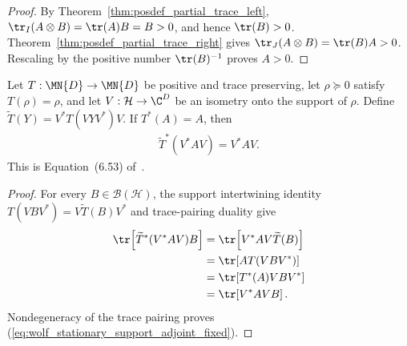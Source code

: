\begin{proof}
    \leanok
    By Theorem~\ref{thm:posdef_partial_trace_left},
    $\tr_I(A\otimes B)=\tr(A)B=B>0$, and hence $\tr(B)>0$.
    Theorem~\ref{thm:posdef_partial_trace_right} gives
    $\tr_J(A\otimes B)=\tr(B)A>0$. Rescaling by the positive number
    $\tr(B)^{-1}$ proves $A>0$.
\end{proof}

\begin{lemma}%
    \label{lem:trace_adjoint_stationary_support_compression_fixed}
    \leanok
    Let $T:\MN{D}\to\MN{D}$ be positive and trace preserving, let
    $\rho\succeq0$ satisfy $T(\rho)=\rho$, and let
    $V:\mathcal H\to\C^D$ be an isometry onto the support of $\rho$. Define
    $\widetilde T(Y)=V^*T(VYV^*)V$. If $T^*(A)=A$, then
    \begin{align}
        \widetilde T^*(V^*AV)=V^*AV.
        \label{eq:wolf_stationary_support_adjoint_fixed}
    \end{align}
    This is Equation~(6.53) of~\cite{Wolf2012Quantum}.
\end{lemma}

\begin{proof}
    \leanok
    For every $B\in\mathcal B(\mathcal H)$, the support intertwining
    identity $T(VBV^*)=V\widetilde T(B)V^*$ and trace-pairing duality give
    \begin{align}
        \tr\!\left[\widetilde T^*(V^*AV)B\right]
        &=\tr\!\left[V^*AV\widetilde T(B)\right]\\
        &=\tr\!\left[AT(VBV^*)\right]\\
        &=\tr\!\left[T^*(A)VBV^*\right]\\
        &=\tr\!\left[V^*AVB\right].
        \notag
    \end{align}
    Nondegeneracy of the trace pairing proves
    (\ref{eq:wolf_stationary_support_adjoint_fixed}).
\end{proof}

